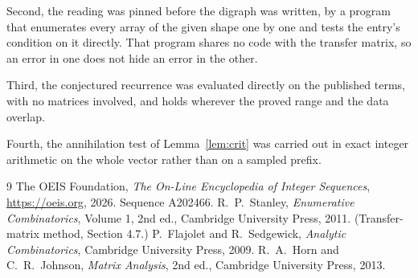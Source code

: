 \documentclass[11pt,a4paper]{article}
\theoremstyle{plain}
\theoremstyle{definition}
\begin{document}
Second, the reading was pinned before the digraph was written, by a program that enumerates
every array of the given shape one by one and tests the entry's condition on it directly. That program shares no code with the transfer matrix, so an error in one does not
hide an error in the other.

Third, the conjectured recurrence was evaluated directly on the published terms, with no
matrices involved, and holds wherever the proved range and the data overlap.

Fourth, the annihilation test of Lemma~\ref{lem:crit} was carried out in exact integer
arithmetic on the whole vector rather than on a sampled prefix.

\begin{thebibliography}{9}
 The OEIS Foundation, \emph{The On-Line Encyclopedia of Integer
Sequences}, \url{https://oeis.org}, 2026. Sequence A202466.
 R.~P.~Stanley, \emph{Enumerative Combinatorics}, Volume 1, 2nd ed.,
Cambridge University Press, 2011. (Transfer-matrix method, Section 4.7.)
 P.~Flajolet and R.~Sedgewick, \emph{Analytic Combinatorics}, Cambridge
University Press, 2009.
 R.~A.~Horn and C.~R.~Johnson, \emph{Matrix Analysis}, 2nd ed., Cambridge
University Press, 2013.
\end{thebibliography}
\end{document}
